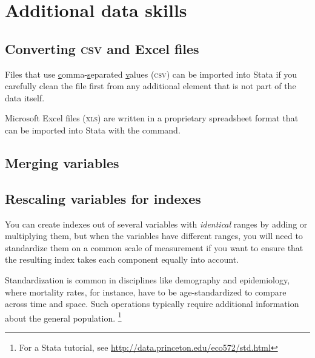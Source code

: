 %
%
\section{Additional data skills}
\label{sec:additional-data-skills}

%
\subsection{Converting \textsc{csv} and Excel files}


\label{sec:insheet}

Files that use \underline{c}omma-\underline{s}eparated \underline{v}alues (\textsc{csv}) can be imported into Stata if you carefully clean the file first from any additional element that is not part of the data itself.

\label{sec:import-excel}

Microsoft Excel files (\textsc{xls}) are written in a proprietary spreadsheet format that can be imported into Stata with the  command.


%
\subsection{Merging variables}
\label{sec:merge}





%
\subsection{Rescaling variables for indexes}

You can create indexes out of several variables with \emph{identical} ranges by adding or multiplying them, but when the variables have different ranges, you will need to standardize them on a common scale of measurement if you want to ensure that the resulting index takes each component equally into account.

Standardization is common in disciplines like demography and epidemiology, where mortality rates, for instance, have to be age-standardized to compare across time and space. Such operations typically require additional information about the general population.%
  \footnote{For a Stata tutorial, see \url{http://data.princeton.edu/eco572/std.html}}

